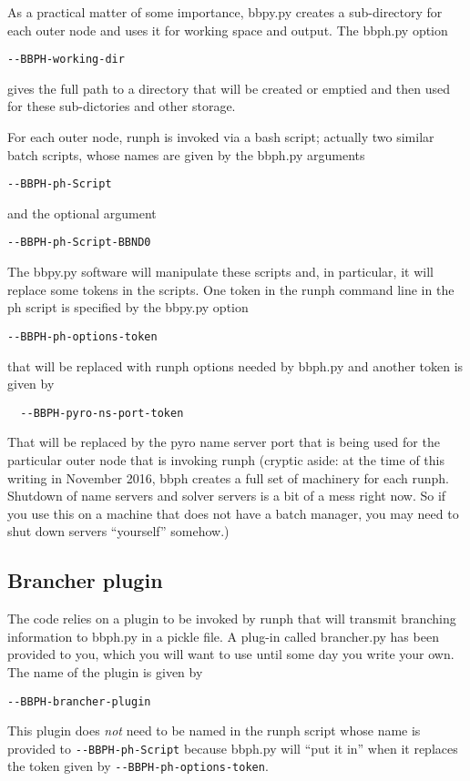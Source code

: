 \documentclass[12pt]{article}
\begin{document}
As a practical matter of some importance, bbpy.py creates a sub-directory
for each outer node and uses it for working space and output. The
bbph.py option
\begin{verbatim}
--BBPH-working-dir
\end{verbatim}
gives the full path to a directory that will be created or emptied and then
used for these sub-dictories and other storage.

For each outer node, runph is invoked via a bash script; actually
two similar batch scripts, whose names are given
by the bbph.py arguments
\begin{verbatim}
--BBPH-ph-Script
\end{verbatim}
and the optional argument
\begin{verbatim}
--BBPH-ph-Script-BBND0
\end{verbatim}
The bbpy.py software will manipulate these scripts and, in particular, it will
replace some tokens in the scripts. One token in the runph command
line in the ph script is specified by the bbpy.py option
\begin{verbatim}
--BBPH-ph-options-token
\end{verbatim}
that will be replaced with runph options needed by bbph.py and another
token is given by
\begin{verbatim}
  --BBPH-pyro-ns-port-token
\end{verbatim}
That will be replaced by the pyro name server port that is being used
for the particular outer node that is invoking runph (cryptic aside:
at the time of this writing in November 2016, bbph creates a full set of machinery
for each runph. Shutdown of name servers and solver servers
is a bit of a mess right now. So if you use this on a machine
that does not have a batch manager, you may need to shut down
servers ``yourself'' somehow.)

\subsection{Brancher plugin}

The code relies on a plugin to be invoked by runph that will transmit branching
information to bbph.py in a pickle file. A plug-in called
brancher.py has been provided to you, which you will want to use
until some day you write your own. The name of the plugin
is given by
\begin{verbatim}
--BBPH-brancher-plugin
\end{verbatim}
This plugin does {\em not} need to be named in the runph
script whose name is provided to \verb|--BBPH-ph-Script|
because bbph.py will ``put it in'' when it replaces the
token given by \verb|--BBPH-ph-options-token|.
\end{document}

